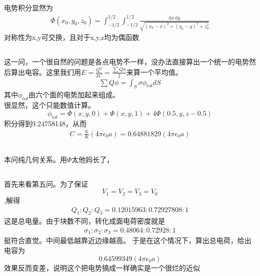 \documentclass{article}
\newcommand{\e}{\epsilon}
\begin{document}
\subsection{}
电势积分显然为
\begin{align}
\boxed{\Phi(x_0,y_0,z_0)=\int_{-1/2}^{1/2}\int_{-1/2}^{1/2}\frac{\mathrm{d}x\,\mathrm{d}y}{\sqrt{(x_0-x)^2+(y_0-y)^2+z_0^2}}}
\end{align}
对称性为x,y可交换，且对于x,y,z均为偶函数
\subsection{}
这一问，一个很自然的问题是各点电势不一样，没办法直接算出一个统一的电势然后算出电容。这里我们用$E=\frac{Q^2}{2C}=\frac{\sum Q\phi}{2}$来算一个平均值。\\
\begin{align}
    \sum Q\phi =\int_S \sigma \phi_{tot}dS
\end{align}
其中$\phi_{tot}$由六个面的电势加起来组成。\\
很显然，这个只能数值计算。$$\phi_{tot}=\Phi(x,y,0)+\Phi(x,y,1)+4\Phi(0.5,y,z-0.5)$$
积分得到9.24758148，从而
\begin{align}
\boxed{C=\frac{6}{K}(4\pi \e _0 a)=0.64881829(4\pi \e _0 a)}
\end{align}
\subsection{}
本问纯几何关系。用$\Phi$太他妈长了，\\
\subsection{}
首先来看第五问。为了保证$$V_1=V_2=V_3=V_0$$,解得
\begin{align}
    Q_1:Q_2:Q_3=0.12015963:0.72927808:1
\end{align}
这是总电量。由于块数不同，转化成面电荷密度就是
\begin{align}
    \sigma_1:\sigma_2:\sigma_3=0.48064:0.72928:1
\end{align}
挺符合直觉。中间最低越靠近边缘越高。
于是在这个情况下，算出总电荷，给出电容为
$$0.64599349(4\pi\e_0 a)$$效果反而变差，说明这个把电势搞成一样确实是一个很烂的近似
\end{document}
